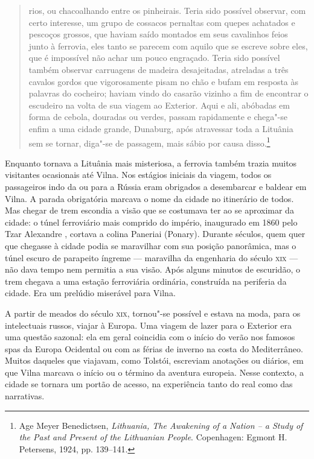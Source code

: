 \begin{quote}
rios, ou chacoalhando entre os pinheirais. Teria sido possível observar,
com certo interesse, um grupo de cossacos pernaltas com quepes achatados
e pescoços grossos, que haviam saído montados em seus cavalinhos feios
junto à ferrovia, eles tanto se parecem com aquilo que se escreve sobre
eles, que é impossível não achar um pouco engraçado. Teria sido possível
também observar carruagens de madeira desajeitadas, atreladas a três
cavalos gordos que vigorosamente pisam no chão e bufam em resposta às
palavras do cocheiro; haviam vindo do casarão vizinho a fim de encontrar
o escudeiro na volta de sua viagem ao Exterior. Aqui e ali, abóbadas em
forma de cebola, douradas ou verdes, passam rapidamente e chega"-se enfim
a uma cidade grande, Dunaburg, após atravessar toda a Lituânia sem se
tornar, diga"-se de passagem, mais sábio por causa disso.\footnote{Age Meyer Benedictsen, \textit{Lithuania, The Awakening of a Nation -- a Study of the Past and Present of the Lithuanian People}. Copenhagen: Egmont H. Petersens, 1924, pp. 139--141.} 
\end{quote}

Enquanto tornava a Lituânia mais misteriosa, a ferrovia também trazia
muitos visitantes ocasionais até Vilna. Nos estágios iniciais da viagem,
todos os passageiros indo da ou para a Rússia eram obrigados a
desembarcar e baldear em Vilna. A parada obrigatória marcava o nome da
cidade no itinerário de todos. Mas chegar de trem escondia a visão que
se costumava ter ao se aproximar da cidade: o túnel ferroviário mais
comprido do império, inaugurado em 1860 pelo Tzar Alexandre , cortava
a colina Paneriai (Ponary). Durante séculos, quem quer que chegasse à
cidade podia se maravilhar com sua posição panorâmica, mas o túnel
escuro de parapeito íngreme --- maravilha da engenharia do século \textsc{xix} --- não
dava tempo nem permitia a sua visão. Após alguns minutos de escuridão, o
trem chegava a uma estação ferroviária ordinária, construída na
periferia da cidade. Era um prelúdio miserável para Vilna.

A partir de meados do século \textsc{xix}, tornou"-se possível e estava na moda,
para os intelectuais russos, viajar à Europa. Uma viagem de lazer para o
Exterior era uma questão sazonal: ela em geral coincidia com o início do
verão nos famosos spas da Europa Ocidental ou com as férias de inverno
na costa do Mediterrâneo. Muitos daqueles que viajavam, como Tolstói,
escreviam anotações ou diários, em que Vilna marcava o início ou o
término da aventura europeia. Nesse contexto, a cidade se tornara um
portão de acesso, na experiência tanto do real como das narrativas.

